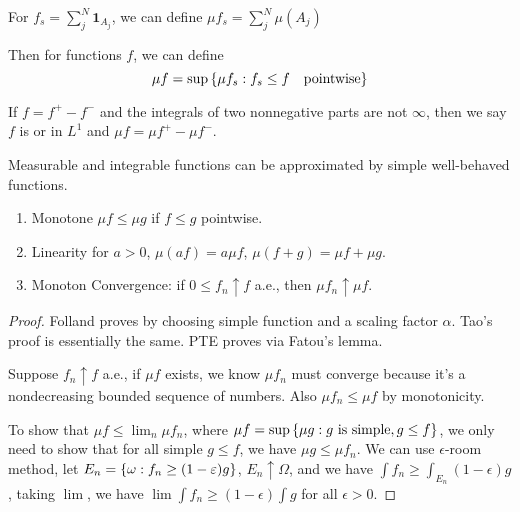 For  \(f_{s} = \sum^{N}_{j} \mathbf{1}_{A_{j}}\), we can define \(\mu f_{s} = \sum^{N}_{j} \mu(A_{j})\)


Then for  functions \(f\), we can define 
\begin{equation*}
    \mu f = \sup \Bqty{\mu f_{s} : f_{s} \leq f \quad \text{pointwise}}
\end{equation*}

If \(f = f^{+} - f^{-}\) and the integrals of two nonnegative parts are not \(\infty\), then we say \(f\) is  or in \({L}^{1}\) and \(\mu f = \mu f^{+} - \mu f^{-}\).  

\begin{thm}
    Measurable and integrable functions can be approximated by simple well-behaved functions.   
\end{thm}
\begin{thm}
    \begin{enumerate}
        \item Monotone \(\mu f \leq \mu g\) if \(f \leq g\) pointwise.
        \item Linearity for \(a > 0\), \(\mu (af) = a \mu f\), \(\mu(f + g)=  \mu f + \mu g\).
        \item Monoton Convergence: if \(0 \leq f_{n} \uparrow f\) a.e., then \(\mu f_{n} \uparrow \mu f\). 
    \end{enumerate}
\end{thm}
\begin{proof}
    Folland proves by choosing simple function and a scaling factor \(\alpha\). Tao's proof is essentially the same.
    PTE proves via Fatou's lemma. 
    
    Suppose \(f_{n}\uparrow f\) a.e., if \(\mu f\) exists, we know \(\mu f_{n}\) must converge because it's a nondecreasing bounded sequence of numbers. Also \(\mu f_{n} \leq \mu f\) by monotonicity. 

    To show that \(\mu f \leq \lim_{n} \mu f_{n}\), where \(\mu f = \sup \Bqty{\mu g: g \text{ is simple}, g \leq f}\), we only need to show that for all simple \(g \leq f\), we have \(\mu g \leq \mu f_{n}\). We can use \(\epsilon\)-room method, let \(E_{n} = \Bqty{\omega: f_{n} \geq (1 - \epsilon) g}\), \(E_{n} \uparrow \Omega\), and we have \(\int f_{n} \geq \int_{E_{n}} (1 - \epsilon)g\), taking \(\lim\), we have \(\lim \int f_{n} \geq (1 - \epsilon) \int g\) for all \(\epsilon> 0\). 
\end{proof}



